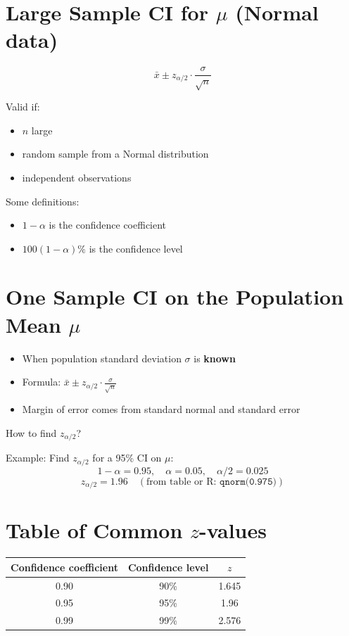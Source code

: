 \section*{Large Sample CI for $\mu$ (Normal data)}

\[
\bar{x} \pm z_{\alpha/2} \cdot \frac{\sigma}{\sqrt{n}}
\]

Valid if:
\begin{itemize}
  \item $n$ large
  \item random sample from a Normal distribution
  \item independent observations
\end{itemize}

Some definitions:
\begin{itemize}
  \item $1 - \alpha$ is the confidence coefficient
  \item $100(1 - \alpha)\%$ is the confidence level
\end{itemize}


\section*{One Sample CI on the Population Mean $\mu$}

\begin{itemize}
  \item When population standard deviation $\sigma$ is \textbf{known}
  \item Formula: $\bar{x} \pm z_{\alpha/2} \cdot \frac{\sigma}{\sqrt{n}}$
  \item Margin of error comes from standard normal and standard error
\end{itemize}

How to find $z_{\alpha/2}$?

Example: Find $z_{\alpha/2}$ for a 95\% CI on $\mu$:
\[
1 - \alpha = 0.95, \quad \alpha = 0.05, \quad \alpha/2 = 0.025
\]
\[
z_{\alpha/2} = 1.96 \quad (\text{from table or R: } \texttt{qnorm(0.975)})
\]


\section*{Table of Common $z$-values}

\begin{center}
\begin{tabular}{|c|c|c|}
\hline
Confidence coefficient & Confidence level & $z$ \\
\hline
0.90 & 90\% & 1.645 \\
0.95 & 95\% & 1.96 \\
0.99 & 99\% & 2.576 \\
\hline
\end{tabular}
\end{center}



